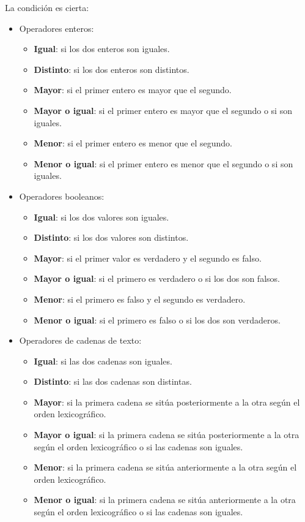 La condición es cierta:
\begin{itemize}
	\item Operadores enteros:
	\begin{itemize}
		\item \textbf{Igual}: si los dos enteros son iguales.
		\item \textbf{Distinto}: si los dos enteros son distintos.
		\item \textbf{Mayor}: si el primer entero es mayor que el segundo.
		\item \textbf{Mayor o igual}: si el primer entero es mayor que el segundo o si son iguales.
		\item \textbf{Menor}: si el primer entero es menor que el segundo.
		\item \textbf{Menor o igual}: si el primer entero es menor que el segundo o si son iguales.
	\end{itemize}
	\item Operadores booleanos:
	\begin{itemize}
		\item \textbf{Igual}: si los dos valores son iguales.
		\item \textbf{Distinto}: si los dos valores son distintos.
		\item \textbf{Mayor}: si el primer valor es verdadero y el segundo es falso.
		\item \textbf{Mayor o igual}: si el primero es verdadero o si los dos son falsos.
		\item \textbf{Menor}: si el primero es falso y el segundo es verdadero.
		\item \textbf{Menor o igual}: si el primero es falso o si los dos son verdaderos.
	\end{itemize}
	\item Operadores de cadenas de texto:
	\begin{itemize}
		\item \textbf{Igual}: si las dos cadenas son iguales.
		\item \textbf{Distinto}: si las dos cadenas son distintas.
		\item \textbf{Mayor}: si la primera cadena se sitúa posteriormente a la otra según el orden lexicográfico.
		\item \textbf{Mayor o igual}: si la primera cadena se sitúa posteriormente a la otra según el orden lexicográfico o si las cadenas son iguales.
		\item \textbf{Menor}: si la primera cadena se sitúa anteriormente a la otra según el orden lexicográfico.
		\item \textbf{Menor o igual}: si la primera cadena se sitúa anteriormente a la otra según el orden lexicográfico o si las cadenas son iguales.
	\end{itemize}
\end{itemize}

